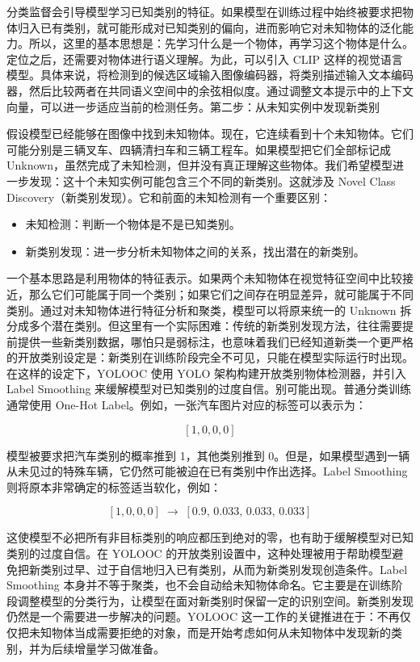 分类监督会引导模型学习已知类别的特征。如果模型在训练过程中始终被要求把物体归入已有类别，就可能形成对已知类别的偏向，进而影响它对未知物体的泛化能力。所以，这里的基本思想是：先学习什么是一个物体，再学习这个物体是什么。定位之后，还需要对物体进行语义理解。为此，可以引入 CLIP 这样的视觉语言模型。具体来说，将检测到的候选区域输入图像编码器，将类别描述输入文本编码器，然后比较两者在共同语义空间中的余弦相似度。通过调整文本提示中的上下文向量，可以进一步适应当前的检测任务。第二步：从未知实例中发现新类别

假设模型已经能够在图像中找到未知物体。现在，它连续看到十个未知物体。它们可能分别是三辆叉车、四辆清扫车和三辆工程车。如果模型把它们全部标记成 Unknown，虽然完成了未知检测，但并没有真正理解这些物体。我们希望模型进一步发现：这十个未知实例可能包含三个不同的新类别。这就涉及 Novel Class Discovery（新类别发现）。它和前面的未知检测有一个重要区别：

\begin{itemize}
  \item 未知检测：判断一个物体是不是已知类别。
  \item 新类别发现：进一步分析未知物体之间的关系，找出潜在的新类别。
\end{itemize}

一个基本思路是利用物体的特征表示。如果两个未知物体在视觉特征空间中比较接近，那么它们可能属于同一个类别；如果它们之间存在明显差异，就可能属于不同类别。通过对未知物体进行特征分析和聚类，模型可以将原来统一的 Unknown 拆分成多个潜在类别。但这里有一个实际困难：传统的新类别发现方法，往往需要提前提供一些新类别数据，哪怕只是弱标注，也意味着我们已经知道新类一个更严格的开放类别设定是：新类别在训练阶段完全不可见，只能在模型实际运行时出现。在这样的设定下，YOLOOC 使用 YOLO 架构构建开放类别物体检测器，并引入 Label Smoothing 来缓解模型对已知类别的过度自信。别可能出现。普通分类训练通常使用 One-Hot Label。例如，一张汽车图片对应的标签可以表示为：

\[
[1,0,0,0]
\]

模型被要求把汽车类别的概率推到 1，其他类别推到 0。但是，如果模型遇到一辆从未见过的特殊车辆，它仍然可能被迫在已有类别中作出选择。Label Smoothing 则将原本非常确定的标签适当软化，例如：

\[
[1,0,0,0]\;\rightarrow\;[0.9,\,0.033,\,0.033,\,0.033]
\]

这使模型不必把所有非目标类别的响应都压到绝对的零，也有助于缓解模型对已知类别的过度自信。在 YOLOOC 的开放类别设置中，这种处理被用于帮助模型避免把新类别过早、过于自信地归入已有类别，从而为新类别发现创造条件。Label Smoothing 本身并不等于聚类，也不会自动给未知物体命名。它主要是在训练阶段调整模型的分类行为，让模型在面对新类别时保留一定的识别空间。新类别发现仍然是一个需要进一步解决的问题。YOLOOC 这一工作的关键推进在于：不再仅仅把未知物体当成需要拒绝的对象，而是开始考虑如何从未知物体中发现新的类别，并为后续增量学习做准备。

